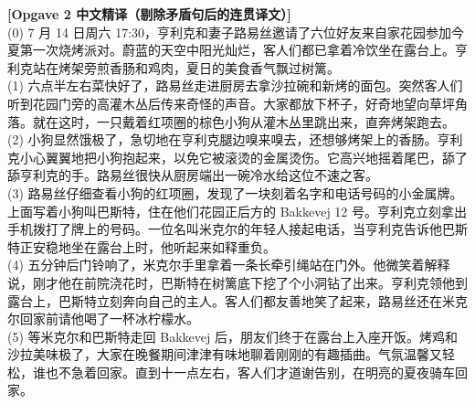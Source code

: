 \begin{transbox}
\small
\textbf{\color{NCDTeal}[Opgave 2 中文精译（剔除矛盾句后的连贯译文）]}\\
(0) 7 月 14 日周六 17:30，亨利克和妻子路易丝邀请了六位好友来自家花园参加今夏第一次烧烤派对。蔚蓝的天空中阳光灿烂，客人们都已拿着冷饮坐在露台上。亨利克站在烤架旁煎香肠和鸡肉，夏日的美食香气飘过树篱。\\
(1) 六点半左右菜快好了，路易丝走进厨房去拿沙拉碗和新烤的面包。突然客人们听到花园门旁的高灌木丛后传来奇怪的声音。大家都放下杯子，好奇地望向草坪角落。就在这时，一只戴着红项圈的棕色小狗从灌木丛里跳出来，直奔烤架跑去。\\
(2) 小狗显然饿极了，急切地在亨利克腿边嗅来嗅去，还想够烤架上的香肠。亨利克小心翼翼地把小狗抱起来，以免它被滚烫的金属烫伤。它高兴地摇着尾巴，舔了舔亨利克的手。路易丝很快从厨房端出一碗冷水给这位不速之客。\\
(3) 路易丝仔细查看小狗的红项圈，发现了一块刻着名字和电话号码的小金属牌。上面写着小狗叫巴斯特，住在他们花园正后方的 Bakkevej 12 号。亨利克立刻拿出手机拨打了牌上的号码。一位名叫米克尔的年轻人接起电话，当亨利克告诉他巴斯特正安稳地坐在露台上时，他听起来如释重负。\\
(4) 五分钟后门铃响了，米克尔手里拿着一条长牵引绳站在门外。他微笑着解释说，刚才他在前院浇花时，巴斯特在树篱底下挖了个小洞钻了出来。亨利克领他到露台上，巴斯特立刻奔向自己的主人。客人们都友善地笑了起来，路易丝还在米克尔回家前请他喝了一杯冰柠檬水。\\
(5) 等米克尔和巴斯特走回 Bakkevej 后，朋友们终于在露台上入座开饭。烤鸡和沙拉美味极了，大家在晚餐期间津津有味地聊着刚刚的有趣插曲。气氛温馨又轻松，谁也不急着回家。直到十一点左右，客人们才道谢告别，在明亮的夏夜骑车回家。
\end{transbox}

